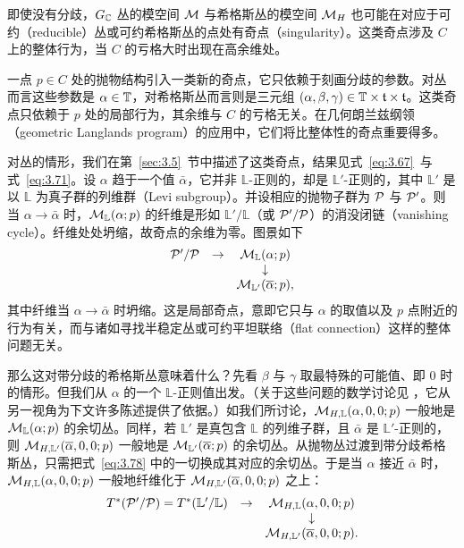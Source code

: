 \bigskip{}

即使没有分歧，$G_{\mathbb{C}}$ 丛的模空间 ${\mathcal{M}}$ 与希格斯丛的模空间 ${\mathcal{M}}_H$ 也可能在对应于可约（reducible）丛或可约希格斯丛的点处有奇点（singularity）。这类奇点涉及 $C$ 上的整体行为，当 $C$ 的亏格大时出现在高余维处。

一点 $p\in C$ 处的抛物结构引入一类新的奇点，它只依赖于刻画分歧的参数。对丛而言这些参数是 $\alpha\in {\mathbb{T}}$，对希格斯丛而言则是三元组 $(\alpha,\beta,\gamma)\in {\mathbb{T}}\times {\mathfrak t}\times {\mathfrak t}$。这类奇点只依赖于 $p$ 处的局部行为，其余维与 $C$ 的亏格无关。在几何朗兰兹纲领（geometric Langlands program）的应用中，它们将比整体性的奇点重要得多。

对丛的情形，我们在第~\ref{sec:3.5}~节中描述了这类奇点，结果见式~\eqref{eq:3.67}\ 与式~\eqref{eq:3.71}。设 $\alpha$ 趋于一个值 $\bar\alpha$，它并非 $\mathbb{L}$-正则的，却是 $\mathbb{L}'$-正则的，其中 $\mathbb{L}'$ 是以 $\mathbb{L}$ 为真子群的列维群（Levi subgroup）。并设相应的抛物子群为 $\mathcal{P}$ 与 $\mathcal{P}'$。则当 $\alpha\to\bar\alpha$ 时，${\mathcal{M}}_\mathbb{L}(\alpha;p)$ 的纤维是形如 $\mathbb{L}'/\mathbb{L}$（或 $\mathcal{P}'/\mathcal{P}$）的消没闭链（vanishing cycle）。纤维处处坍缩，故奇点的余维为零。图景如下
\setcounter{equation}{77}
\begin{equation}\label{eq:3.78}
  \begin{matrix}\mathcal{P}'/\mathcal{P}&\to & {\mathcal{M}}_\mathbb{L}(\alpha;p)\\
                           & &        \downarrow\\
                           & &      {\mathcal{M}}_{\mathbb{L}'}(\overline\alpha;p),\end{matrix}
\end{equation}
其中纤维当 $\alpha\to\bar\alpha$ 时坍缩。这是局部奇点，意即它只与 $\alpha$ 的取值以及 $p$ 点附近的行为有关，而与诸如寻找半稳定丛或可约平坦联络（flat connection）这样的整体问题无关。

那么这对带分歧的希格斯丛意味着什么？先看 $\beta$ 与 $\gamma$ 取最特殊的可能值、即 $0$ 时的情形。但我们从 $\alpha$ 的一个 $\mathbb{L}$-正则值出发。（关于这些问题的数学讨论见 \cite{ref61}，它从另一视角为下文许多陈述提供了依据。）如我们所讨论，${\mathcal{M}}_{H,\mathbb{L}}(\alpha,0,0;p)$ 一般地是 ${\mathcal{M}}_\mathbb{L}(\alpha;p)$ 的余切丛。同样，若 $\mathbb{L}'$ 是真包含 $\mathbb{L}$ 的列维子群，且 $\bar\alpha$ 是 $\mathbb{L}'$-正则的，则 ${\mathcal{M}}_{H,\mathbb{L}'}(\overline\alpha,0,0;p)$ 一般地是 ${\mathcal{M}}_{\mathbb{L}'}(\overline\alpha;p)$ 的余切丛。从抛物丛过渡到带分歧希格斯丛，只需把式~\eqref{eq:3.78} 中的一切换成其对应的余切丛。于是当 $\alpha$ 接近 $\bar\alpha$ 时，${\mathcal{M}}_{H,\mathbb{L}}(\alpha,0,0;p)$ 一般地纤维化于 ${\mathcal{M}}_{H,\mathbb{L}'}(\overline\alpha,0,0;p)$ 之上：
\setcounter{equation}{78}
\begin{equation}\label{eq:3.79}
  \begin{matrix}T^*(\mathcal{P}'/\mathcal{P})=T^*(\mathbb{L}'/\mathbb{L})&\to& {\mathcal{M}}_{H,\mathbb{L}}(\alpha,0,0;p)\\
                                &   & \downarrow \\
                                & & {\mathcal{M}}_{H,\mathbb{L}'}(\overline\alpha,0,0;p). \end{matrix}
\end{equation}

